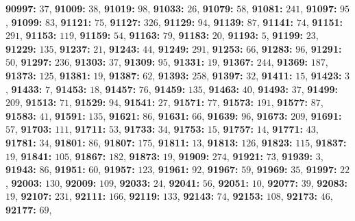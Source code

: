 \textsf{\bfseries 90997:} $37$, \textsf{\bfseries 91009:} $38$, \textsf{\bfseries 91019:} $98$, \textsf{\bfseries 91033:} $26$, \textsf{\bfseries 91079:} $58$, \textsf{\bfseries 91081:} $241$, \textsf{\bfseries 91097:} $95$, \textsf{\bfseries 91099:} $83$, \textsf{\bfseries 91121:} $75$, \textsf{\bfseries 91127:} $326$, \textsf{\bfseries 91129:} $94$, \textsf{\bfseries 91139:} $87$, \textsf{\bfseries 91141:} $74$, \textsf{\bfseries 91151:} $291$, \textsf{\bfseries 91153:} $119$, \textsf{\bfseries 91159:} $54$, \textsf{\bfseries 91163:} $79$, \textsf{\bfseries 91183:} $20$, \textsf{\bfseries 91193:} $5$, \textsf{\bfseries 91199:} $23$, \textsf{\bfseries 91229:} $135$, \textsf{\bfseries 91237:} $21$, \textsf{\bfseries 91243:} $44$, \textsf{\bfseries 91249:} $291$, \textsf{\bfseries 91253:} $66$, \textsf{\bfseries 91283:} $96$, \textsf{\bfseries 91291:} $50$, \textsf{\bfseries 91297:} $236$, \textsf{\bfseries 91303:} $37$, \textsf{\bfseries 91309:} $95$, \textsf{\bfseries 91331:} $19$, \textsf{\bfseries 91367:} $244$, \textsf{\bfseries 91369:} $187$, \textsf{\bfseries 91373:} $125$, \textsf{\bfseries 91381:} $19$, \textsf{\bfseries 91387:} $62$, \textsf{\bfseries 91393:} $258$, \textsf{\bfseries 91397:} $32$, \textsf{\bfseries 91411:} $15$, \textsf{\bfseries 91423:} $3$, \textsf{\bfseries 91433:} $7$, \textsf{\bfseries 91453:} $18$, \textsf{\bfseries 91457:} $76$, \textsf{\bfseries 91459:} $135$, \textsf{\bfseries 91463:} $40$, \textsf{\bfseries 91493:} $37$, \textsf{\bfseries 91499:} $209$, \textsf{\bfseries 91513:} $71$, \textsf{\bfseries 91529:} $94$, \textsf{\bfseries 91541:} $27$, \textsf{\bfseries 91571:} $77$, \textsf{\bfseries 91573:} $191$, \textsf{\bfseries 91577:} $87$, \textsf{\bfseries 91583:} $41$, \textsf{\bfseries 91591:} $135$, \textsf{\bfseries 91621:} $86$, \textsf{\bfseries 91631:} $66$, \textsf{\bfseries 91639:} $96$, \textsf{\bfseries 91673:} $209$, \textsf{\bfseries 91691:} $57$, \textsf{\bfseries 91703:} $111$, \textsf{\bfseries 91711:} $53$, \textsf{\bfseries 91733:} $34$, \textsf{\bfseries 91753:} $15$, \textsf{\bfseries 91757:} $14$, \textsf{\bfseries 91771:} $43$, \textsf{\bfseries 91781:} $34$, \textsf{\bfseries 91801:} $86$, \textsf{\bfseries 91807:} $175$, \textsf{\bfseries 91811:} $13$, \textsf{\bfseries 91813:} $126$, \textsf{\bfseries 91823:} $115$, \textsf{\bfseries 91837:} $19$, \textsf{\bfseries 91841:} $105$, \textsf{\bfseries 91867:} $182$, \textsf{\bfseries 91873:} $19$, \textsf{\bfseries 91909:} $274$, \textsf{\bfseries 91921:} $73$, \textsf{\bfseries 91939:} $3$, \textsf{\bfseries 91943:} $86$, \textsf{\bfseries 91951:} $60$, \textsf{\bfseries 91957:} $123$, \textsf{\bfseries 91961:} $92$, \textsf{\bfseries 91967:} $59$, \textsf{\bfseries 91969:} $35$, \textsf{\bfseries 91997:} $22$, \textsf{\bfseries 92003:} $130$, \textsf{\bfseries 92009:} $109$, \textsf{\bfseries 92033:} $24$, \textsf{\bfseries 92041:} $56$, \textsf{\bfseries 92051:} $10$, \textsf{\bfseries 92077:} $39$, \textsf{\bfseries 92083:} $19$, \textsf{\bfseries 92107:} $231$, \textsf{\bfseries 92111:} $166$, \textsf{\bfseries 92119:} $133$, \textsf{\bfseries 92143:} $74$, \textsf{\bfseries 92153:} $108$, \textsf{\bfseries 92173:} $46$, \textsf{\bfseries 92177:} $69$, 
